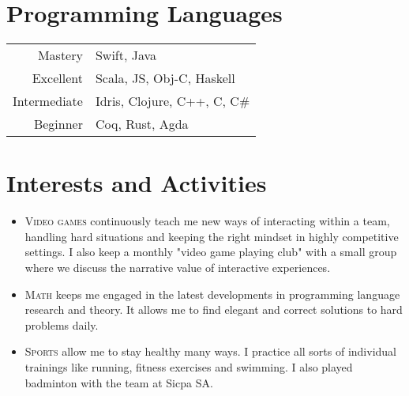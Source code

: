 \documentclass[a4paper,10pt]{article} %
\begin{document}

\section{Programming Languages}

\begin{tabular}{r|l}
Mastery & Swift, Java\\
Excellent & Scala, JS, Obj-C, Haskell\\
Intermediate & Idris, Clojure, C++, C, C\#\\
Beginner & Coq, Rust, Agda\\
\end{tabular}

\section{Interests and Activities}
\begin{itemize}
	\item \textsc{Video games} continuously teach me new ways of interacting within a team, handling hard situations and keeping the right mindset in highly competitive settings. I also keep a monthly "video game playing club" with a small group where we discuss the narrative value of interactive experiences.
	\item \textsc{Math} keeps me engaged in the latest developments in programming language research and theory. It allows me to find elegant and correct solutions to hard problems daily.
	\item \textsc{Sports} allow me to stay healthy many ways. I practice all sorts of individual trainings like running, fitness exercises and swimming. I also played badminton with the team at Sicpa SA.
\end{itemize}
\end{document}
